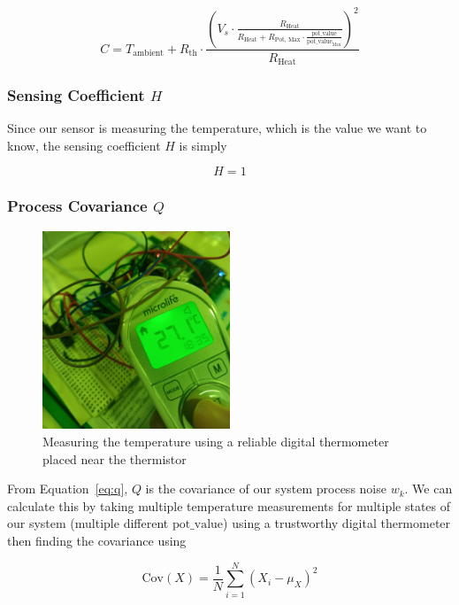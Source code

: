 \documentclass[12pt,a4paper]{article}
\begin{document}
\begin{equation*}
    C = T_{\text{ambient}} + R_{\text{th}} \cdot \frac{\left(V_s \cdot \frac{R_{\text{Heat}}}{R_{\text{Heat}} + R_{\text{Pot, Max}} \cdot \frac{\text{pot\_value}}{\text{pot\_value}_{\text{Max}}}}\right)^2}{R_{\text{Heat}}}
\end{equation*}

\subsubsection{Sensing Coefficient $H$}
Since our sensor is measuring the temperature, which is the value we want to know, the sensing coefficient $H$ is simply

\begin{equation*}
    H = 1
\end{equation*}

\subsubsection{Process Covariance $Q$}

\begin{figure}[h]
    \centering
    \includegraphics[width=0.5\textwidth]{images/measure_temp.jpg}
    \caption{Measuring the temperature using a reliable digital thermometer placed near the thermistor}
    \label{fig:measure-temp}
\end{figure}

From Equation~\eqref{eq:q}, $Q$ is the covariance of our system process noise $w_k$. We can calculate this by taking multiple temperature measurements for multiple states of our system (multiple different $\text{pot\_value}$) using a trustworthy digital thermometer then finding the covariance using


\begin{equation}
    \label{eq:cov}
    \mathrm{Cov}(X) = \frac{1}{N} \sum_{i=1}^{N} (X_i - \mu_X)^2
\end{equation}
\end{document}
